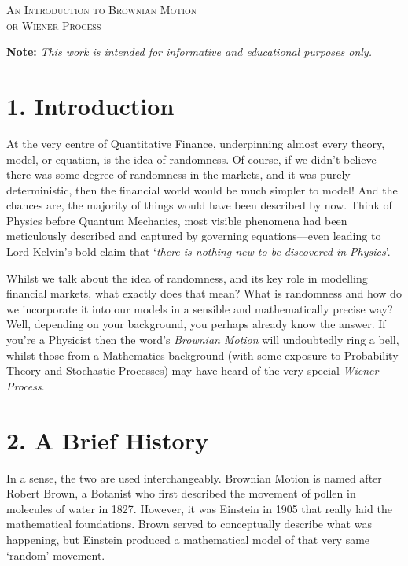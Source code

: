 \documentclass[11pt]{article}
\begin{document}

\begin{tcolorbox}
\begin{center}
    \large
    \textsc{An Introduction to Brownian Motion \\ or Wiener Process}
\end{center}
\end{tcolorbox}

\begin{center}
\textbf{Note:} \textit{This work is intended for informative and educational purposes only.}
\end{center}

\section*{1. Introduction}
At the very centre of Quantitative Finance, underpinning almost every theory, model, or equation, is the idea of randomness. Of course, if we didn't believe there was some degree of randomness in the markets, and it was purely deterministic, then the financial world would be much simpler to model! And the chances are, the majority of things would have been described by now. Think of Physics before Quantum Mechanics, most visible phenomena had been meticulously described and captured by governing equations––even leading to Lord Kelvin's bold claim that `\textit{there is nothing new to be discovered in Physics}'.

Whilst we talk about the idea of randomness, and its key role in modelling financial markets, what exactly does that mean? What is randomness and how do we incorporate it into our models in a sensible and mathematically precise way? Well, depending on your background, you perhaps already know the answer. If you're a Physicist then the word's \textit{Brownian Motion} will undoubtedly ring a bell, whilst those from a Mathematics background (with some exposure to Probability Theory and Stochastic Processes) may have heard of the very special \textit{Wiener Process}.

\section*{2. A Brief History}
In a sense, the two are used interchangeably. Brownian Motion is named after Robert Brown, a Botanist who first described the movement of pollen in molecules of water in 1827. However, it was Einstein in 1905 that really laid the mathematical foundations. Brown served to conceptually describe what was happening, but Einstein produced a mathematical model of that very same `random' movement. 
\end{document}
